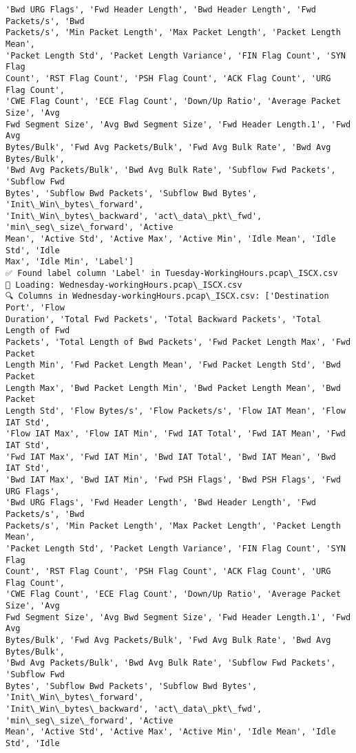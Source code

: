 \documentclass[11pt]{article}
\begin{document}
\begin{Verbatim}[commandchars=\\\{\}]
'Bwd URG Flags', 'Fwd Header Length', 'Bwd Header Length', 'Fwd Packets/s', 'Bwd
Packets/s', 'Min Packet Length', 'Max Packet Length', 'Packet Length Mean',
'Packet Length Std', 'Packet Length Variance', 'FIN Flag Count', 'SYN Flag
Count', 'RST Flag Count', 'PSH Flag Count', 'ACK Flag Count', 'URG Flag Count',
'CWE Flag Count', 'ECE Flag Count', 'Down/Up Ratio', 'Average Packet Size', 'Avg
Fwd Segment Size', 'Avg Bwd Segment Size', 'Fwd Header Length.1', 'Fwd Avg
Bytes/Bulk', 'Fwd Avg Packets/Bulk', 'Fwd Avg Bulk Rate', 'Bwd Avg Bytes/Bulk',
'Bwd Avg Packets/Bulk', 'Bwd Avg Bulk Rate', 'Subflow Fwd Packets', 'Subflow Fwd
Bytes', 'Subflow Bwd Packets', 'Subflow Bwd Bytes', 'Init\_Win\_bytes\_forward',
'Init\_Win\_bytes\_backward', 'act\_data\_pkt\_fwd', 'min\_seg\_size\_forward', 'Active
Mean', 'Active Std', 'Active Max', 'Active Min', 'Idle Mean', 'Idle Std', 'Idle
Max', 'Idle Min', 'Label']
✅ Found label column 'Label' in Tuesday-WorkingHours.pcap\_ISCX.csv
📅 Loading: Wednesday-workingHours.pcap\_ISCX.csv
🔍 Columns in Wednesday-workingHours.pcap\_ISCX.csv: ['Destination Port', 'Flow
Duration', 'Total Fwd Packets', 'Total Backward Packets', 'Total Length of Fwd
Packets', 'Total Length of Bwd Packets', 'Fwd Packet Length Max', 'Fwd Packet
Length Min', 'Fwd Packet Length Mean', 'Fwd Packet Length Std', 'Bwd Packet
Length Max', 'Bwd Packet Length Min', 'Bwd Packet Length Mean', 'Bwd Packet
Length Std', 'Flow Bytes/s', 'Flow Packets/s', 'Flow IAT Mean', 'Flow IAT Std',
'Flow IAT Max', 'Flow IAT Min', 'Fwd IAT Total', 'Fwd IAT Mean', 'Fwd IAT Std',
'Fwd IAT Max', 'Fwd IAT Min', 'Bwd IAT Total', 'Bwd IAT Mean', 'Bwd IAT Std',
'Bwd IAT Max', 'Bwd IAT Min', 'Fwd PSH Flags', 'Bwd PSH Flags', 'Fwd URG Flags',
'Bwd URG Flags', 'Fwd Header Length', 'Bwd Header Length', 'Fwd Packets/s', 'Bwd
Packets/s', 'Min Packet Length', 'Max Packet Length', 'Packet Length Mean',
'Packet Length Std', 'Packet Length Variance', 'FIN Flag Count', 'SYN Flag
Count', 'RST Flag Count', 'PSH Flag Count', 'ACK Flag Count', 'URG Flag Count',
'CWE Flag Count', 'ECE Flag Count', 'Down/Up Ratio', 'Average Packet Size', 'Avg
Fwd Segment Size', 'Avg Bwd Segment Size', 'Fwd Header Length.1', 'Fwd Avg
Bytes/Bulk', 'Fwd Avg Packets/Bulk', 'Fwd Avg Bulk Rate', 'Bwd Avg Bytes/Bulk',
'Bwd Avg Packets/Bulk', 'Bwd Avg Bulk Rate', 'Subflow Fwd Packets', 'Subflow Fwd
Bytes', 'Subflow Bwd Packets', 'Subflow Bwd Bytes', 'Init\_Win\_bytes\_forward',
'Init\_Win\_bytes\_backward', 'act\_data\_pkt\_fwd', 'min\_seg\_size\_forward', 'Active
Mean', 'Active Std', 'Active Max', 'Active Min', 'Idle Mean', 'Idle Std', 'Idle

\end{Verbatim}
\end{document}
